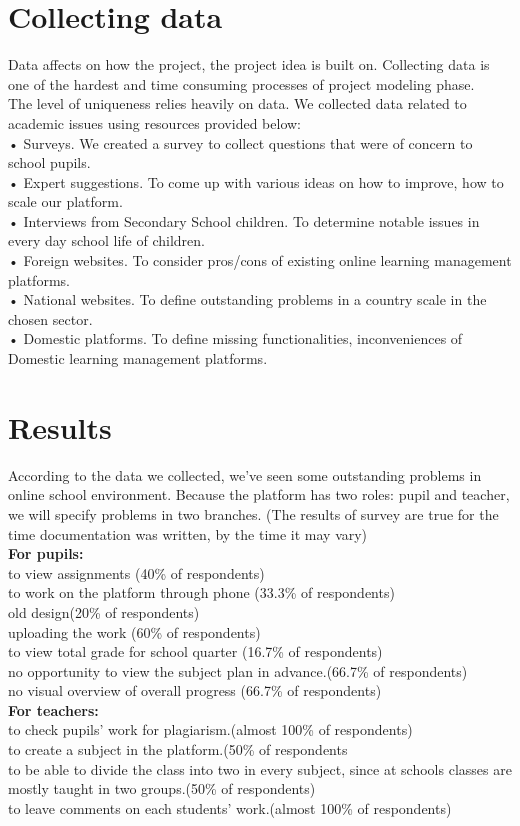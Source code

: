 \section{Collecting data}
Data affects on how the project, the project idea is built on. Collecting data is one of the hardest and time consuming processes of project modeling phase.  \\
The level of uniqueness relies heavily on data. We collected data related to academic issues using resources provided below:\\
• Surveys. We created a survey to collect questions that were of concern to school pupils.\\
• Expert suggestions. To come up with various ideas on how to improve, how to scale our platform.\\
• Interviews from Secondary School children. To determine notable issues in every day school life of children.\\
• Foreign websites. To consider pros/cons of existing online learning management platforms.\\
• National websites. To define outstanding problems in a country scale in the chosen sector.\\
• Domestic platforms. To define missing functionalities, inconveniences of Domestic learning management platforms.
\section{Results}
According to the data we collected, we've seen some outstanding problems in online school environment. Because the platform has two roles: pupil and teacher, we will specify problems in two branches.
(The results of survey are true for the time documentation was written, by the time it may vary)\\
\textbf{For pupils:}\\
to view assignments (40\% of respondents)\\
to work on the platform through phone (33.3\% of respondents)\\
old design(20\% of respondents)\\
uploading the work (60\% of respondents)\\
to view total grade for school quarter (16.7\% of respondents)\\
no opportunity to view the subject plan in advance.(66.7\% of respondents)\\
no visual overview of overall progress (66.7\% of respondents)\\
\textbf{For teachers:}\\
to check pupils' work for plagiarism.(almost 100\% of respondents)\\
to create a subject in the platform.(50\% of respondents\\
to be able to divide the class into two in every subject, since at schools classes are mostly taught in two groups.(50\% of respondents)\\
to leave comments on each students' work.(almost 100\% of respondents)\\

